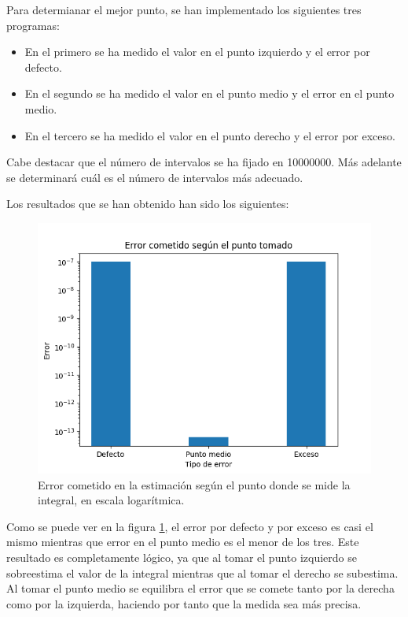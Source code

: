 \documentclass[11pt,a4paper]{article}
\begin{document}
Para determianar el mejor punto, se han implementado los siguientes tres programas:

\begin{itemize}[label=\textbullet]
	\item En el primero se ha medido el valor en el punto izquierdo y el error por defecto.
	\item En el segundo se ha medido el valor en el punto medio y el error en el punto medio.
	\item En el tercero se ha medido el valor en el punto derecho y el error por exceso.
\end{itemize}

Cabe destacar que el número de intervalos se ha fijado en 10000000. Más adelante se determinará
cuál es el número de intervalos más adecuado.

Los resultados que se han obtenido han sido los siguientes:

\begin{figure}[H]
  \centering
  \includegraphics[scale=0.6]{img/error-puntos}
  \caption{Error cometido en la estimación según el punto donde se mide la integral, en escala
  logarítmica.}
  \label{fig:error}
\end{figure}

Como se puede ver en la figura \ref{fig:error}, el error por defecto y por exceso es casi el
mismo mientras que error en el punto medio es el menor de los tres. Este resultado es
completamente lógico, ya que al tomar el punto izquierdo se sobreestima el valor de la integral
mientras que al tomar el derecho se subestima. Al tomar el punto medio se equilibra el error que
se comete tanto por la derecha como por la izquierda, haciendo por tanto que la medida sea más
precisa.
\end{document}
